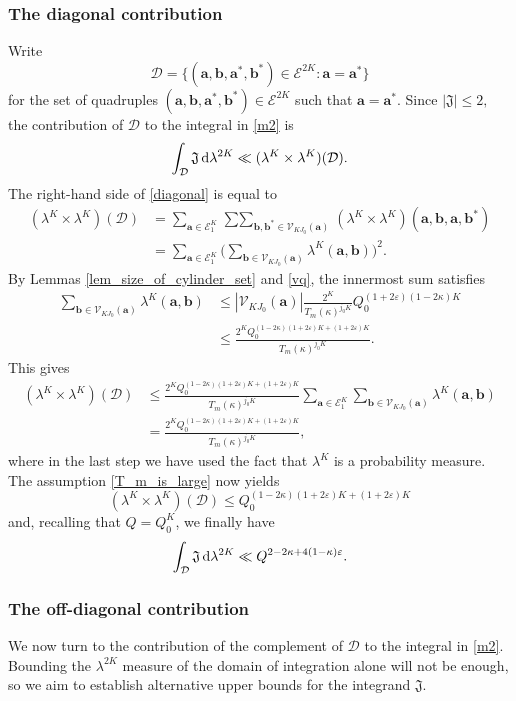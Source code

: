 \documentclass[12pt, reqno]{amsart}
\theoremstyle{definition}
\theoremstyle{remark}
\numberwithin{equation}{section}
\def\kap{{\kappa}}
\def\lam{{\lambda}} \def\Lam{{\Lambda}} \def\Lamtil{{\widetilde \Lambda}}
\def\eps{\varepsilon}
\def\le{\leqslant} \def\ge{\geqslant}
\def\ls{\leqslant} \def\gs{\geqslant}
\def\d{{\,{\rm d}}}
\def \ba {\mathbf a}
\def \bb {\mathbf b}
\def \fJ {\mathfrak J}
\def \cD {\mathcal D}
\def \cE {\mathcal E}
\def \cV {\mathcal V}
\begin{document}
\subsubsection{The diagonal contribution} \label{ss_diagonal_contribution}
Write 
\[
\cD = \{ (\ba, \bb, \ba^*, \bb^*) \in \cE^{2K}: \ba = \ba^* \}
\]
for the set of quadruples $(\ba,\bb,\ba^*,\bb^*)\in \cE^{2K}$ such that $\ba = \ba^*$. Since $|\fJ| \le 2,$ the contribution of $\cD$ to the integral in \eqref{m2} is
\begin{equation} \label{diagonal}
\int_{\cD}\fJ \d \lam^{2K} \ll   (\lambda^K \times \lambda^K)(\cD).
\end{equation}   
The right-hand side of \eqref{diagonal} is equal to 
\begin{align*}
(\lambda^K \times \lambda^K)(\cD) & = \sum_{\ba \in \cE_1^{K}}\mathop{\sum\sum}_{\bb, \bb^* \in \cV_{KJ_0}(\ba)}(\lambda^K \times \lambda^K)(\ba,\bb,\ba,\bb^*)\\
& = \sum_{\ba \in \cE_1^{K}} \Bigg(\sum_{\bb\in \cV_{KJ_0}(\ba)}\!\!\lambda^K(\ba,\bb)\Bigg)^2 .
\end{align*}
By Lemmas \ref{lem_size_of_cylinder_set} and \ref{vq}, the innermost sum   satisfies
\begin{align*}
\sum_{\bb\in \cV_{KJ_0}(\ba)}\!\!\lambda^K(\ba,\bb) 
&\ls 
| \cV_{KJ_0}(\ba)| \frac{2^K}{T_m(\kappa)^{j_0K}}Q_0^{(1+2\varepsilon)(1-2\kappa)K}\\
&\le \frac{2^{K}Q_0^{(1-2\kap)(1+2\eps)K+(1+2\eps)K}}{T_m(\kap)^{j_0K}}.
\end{align*}
This gives
\begin{align*}
(\lambda^K \times \lambda^K)(\cD) &\ls \frac{2^{K}Q_0^{(1-2\kap)(1+2\eps)K+(1+2\eps)K}}{T_m(\kap)^{j_0K}} \sum_{\ba \in \cE_1^{K}}  \sum_{\bb\in \cV_{KJ_0}(\ba)}\!\!\lambda^K(\ba,\bb) \\
& = \frac{2^{K}Q_0^{(1-2\kap)(1+2\eps)K+(1+2\eps)K}}{T_m(\kap)^{j_0K}},
\end{align*}   
where in the last step we have used the fact that $\lambda^K$ is a probability measure. The assumption \eqref{T_m_is_large} now yields 
\[   
(\lambda^K \times \lambda^K)(\cD)  \ls  Q_0^{(1-2\kap)(1+2\eps)K+(1+2\eps)K}  
\]
and, recalling that $Q = Q_0^K$, we finally have
\[  
\int_{\cD}\fJ \d \lam^{2K}  
\ll  Q^{2-2\kappa 
+ 4(1-\kappa)\varepsilon}.  
\]

\subsubsection{The off-diagonal contribution} We now turn to the contribution of the complement of $\cD$ to the integral in \eqref{m2}. Bounding the $\lam^{2K}$ measure of the domain of integration alone will not be enough, so we aim to establish alternative upper bounds for the integrand $\fJ.$ \par
\end{document}
